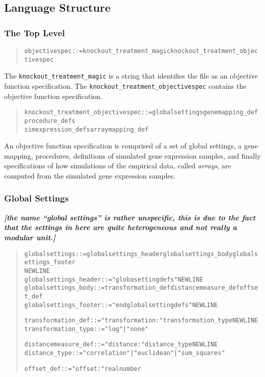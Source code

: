 \documentclass[a4paper,fleqn]{article}
\newcommand{\computercode}[1]{\texttt{#1}}
\newcommand{\newterm}[1]{\emph{#1}}
\newcommand{\todo}[1]{\rule{0pt}{0pt}\marginpar{\rule{1ex}{1ex}}\textbf{\emph{[#1]}}}
\newenvironment{ebnfrule}{\begin{footnotesize}\begin{quote}\begin{alltt}}{\end{alltt}\end{quote}\end{footnotesize}}
\begin{document}
\subsection{Language Structure}

\subsubsection{The Top Level}

\begin{ebnfrule}
objectivespec ::= knockout_treatment_magic knockout_treatment_objectivespec
\end{ebnfrule}
The \computercode{knockout\_treatment\_magic} is a string that
identifies the file as an objective function specification. The
\computercode{knockout\_treatment\_objectivespec} contains the
objective function specification.

\begin{ebnfrule}
knockout_treatment_objectivespec ::= globalsettings genemapping_def procedure_defs 
simexpression_defs arraymapping_def 
\end{ebnfrule}
An objective function specification is comprised of a set of global
settings, a gene mapping, procedures, definitions of simulated gene
expression samples, and finally specifications of how simulations of
the empirical data, called \newterm{arrays}, are computed from the
simulated gene expression samples.


\subsubsection{Global Settings}

\todo{the name ``global settings'' is rather unspecific, this is due
  to the fact that the settings in here are quite heterogeneous and
  not really a modular unit.}

\begin{ebnfrule}
globalsettings ::= globalsettings_header globalsettings_body globalsettings_footer
NEWLINE
globalsettings_header ::= "globasettingdefs" NEWLINE
globalsettings_body ::= transformation_def distancemeasure_def offset_def
globalsettings_footer ::= "endglobalsettingdefs" NEWLINE

transformation_def ::= "transformation:" transformation_type NEWLINE
transformation_type ::= "log" | "none"

distancemeasure_def ::= "distance:" distance_type NEWLINE
distance_type ::= "correlation" | "euclidean" | "sum_squares" 

offset_def ::= "offset:" realnumber
\end{ebnfrule}
\end{document}
